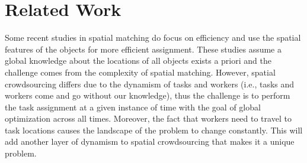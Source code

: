 \section{Related Work}



Some recent studies in spatial matching \cite{Wong07,Long13} do focus on efficiency and use the spatial features of the objects for more efficient assignment. These studies assume a global knowledge about the locations of all objects exists a priori and the challenge comes from the complexity of spatial matching. However, spatial crowdsourcing differs due to the dynamism of tasks and workers (i.e., tasks and workers come and go without our knowledge), thus the challenge is to perform the task assignment at a given instance of time with the goal of global optimization across all times. Moreover, the fact that workers need to travel to task locations causes the landscape of the problem to change constantly. This will add another layer of dynamism to spatial crowdsourcing that makes it a unique problem.

